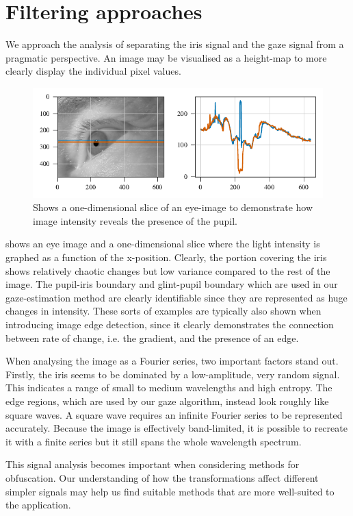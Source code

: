 \section{Filtering approaches}
We approach the analysis of separating the iris signal and the gaze signal from a pragmatic perspective. An image may be visualised as a height-map to more clearly display the individual pixel values. 

\begin{figure}
	\includegraphics[width=1\textwidth]{figures/1dimage}
	\caption{Shows a one-dimensional slice of an eye-image to demonstrate how image intensity reveals the presence of the pupil.}\label{fig:1dimage}
\end{figure}

 shows an eye image and a one-dimensional slice where the light intensity is graphed as a function of the x-position. Clearly, the portion covering the iris shows relatively chaotic changes but low variance compared to the rest of the image. The pupil-iris boundary and glint-pupil boundary which are used in our gaze-estimation method are clearly identifiable since they are represented as huge changes in intensity. These sorts of examples are typically also shown when introducing image edge detection, since it clearly demonstrates the connection between rate of change, i.e. the gradient, and the presence of an edge. 

When analysing the image as a Fourier series, two important factors stand out. Firstly, the iris seems to be dominated by a low-amplitude, very random signal. This indicates a range of small to medium wavelengths and high entropy. The edge regions, which are used by our gaze algorithm, instead look roughly like square waves. A square wave requires an infinite Fourier series to be represented accurately. Because the image is effectively band-limited, it is possible to recreate it with a finite series but it still spans the whole wavelength spectrum.

This signal analysis becomes important when considering methods for obfuscation. Our understanding of how the transformations affect different simpler signals may help us find suitable methods that are more well-suited to the application.


